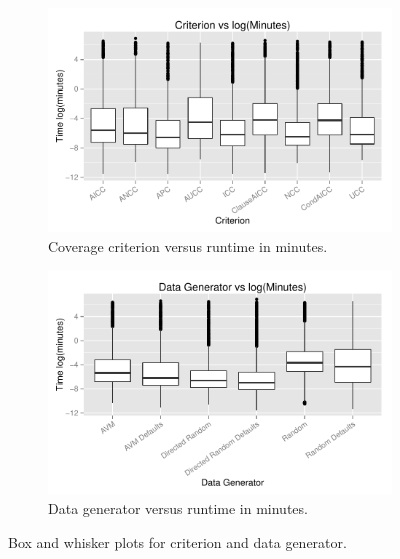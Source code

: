 \begin{figure}
\centering
\begin{subfigure}{0.5\textwidth}
  \centering
  \includegraphics[width=1\linewidth]{diagrams/CriterionvsTime.pdf}
  \caption{Coverage criterion versus runtime in minutes.}
  \label{fig:crites}
\end{subfigure}%
\begin{subfigure}{0.5\textwidth}
  \centering
  \includegraphics[width=1\linewidth]{diagrams/DataGeneratorvsTime.pdf}
  \caption{Data generator versus runtime in minutes.}
  \label{fig:datas}
\end{subfigure}
\label{fig:bwplots}
\caption{Box and whisker plots for criterion and data
  generator.}

\end{figure}

